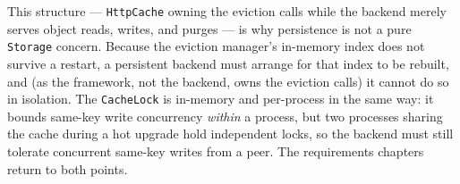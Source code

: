 This structure --- \texttt{HttpCache} owning the eviction calls while the backend
merely serves object reads, writes, and purges --- is why persistence is not a
pure \texttt{Storage} concern. Because the eviction manager's in-memory index does
not survive a restart, a persistent backend must arrange for that index to be
rebuilt, and (as the framework, not the backend, owns the eviction calls) it
cannot do so in isolation. The \texttt{CacheLock} is in-memory and per-process in
the same way: it bounds same-key write concurrency \emph{within} a process, but two
processes sharing the cache during a hot upgrade hold independent locks, so the
backend must still tolerate concurrent same-key writes from a peer. The
requirements chapters return to both points.
